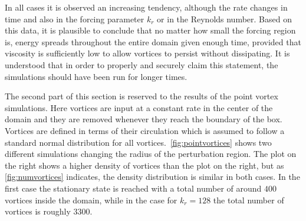 \documentclass[../main.tex]{subfiles}
\begin{document}
In all cases it is observed an increasing tendency, although the rate changes in time and also in the forcing parameter $k_r$ or in the Reynolds number. Based on this data, it is plausible to conclude that no matter how small the forcing region is, energy spreads throughout the entire domain given enough time, provided that viscosity is sufficiently low to allow vortices to persist without dissipating. It is understood that in order to properly and securely claim this statement, the simulations should have been run for longer times.

The second part of this section is reserved to the results of the point vortex simulations. Here vortices are input at a constant rate in the center of the domain and they are removed whenever they reach the boundary of the box. Vortices are defined in terms of their circulation which is assumed to follow a standard normal distribution for all vortices.~\cref{fig:pointvortices} shows two different simulations changing the radius of the perturbation region. The plot on the right shows a higher density of vortices than the plot on the right, but as \cref{fig:numvortices} indicates, the density distribution is similar in both cases. In the first case the stationary state is reached with a total number of around $ 400$ vortices inside the domain, while in the case for $k_r=128$ the total number of vortices is roughly $3300$.
\end{document}
